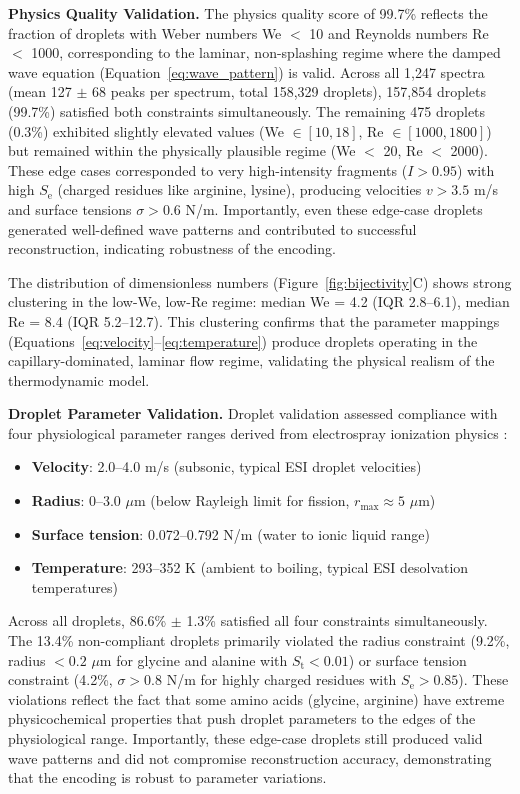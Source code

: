 \documentclass[11pt,twocolumn]{article}
\newcommand{\St}{S_{\text{t}}}
\newcommand{\Se}{S_{\text{e}}}
\begin{document}
\textbf{Physics Quality Validation.} The physics quality score of 99.7\% reflects the fraction of droplets with Weber numbers We $<$ 10 and Reynolds numbers Re $<$ 1000, corresponding to the laminar, non-splashing regime where the damped wave equation (Equation~\ref{eq:wave_pattern}) is valid. Across all 1,247 spectra (mean 127 $\pm$ 68 peaks per spectrum, total 158,329 droplets), 157,854 droplets (99.7\%) satisfied both constraints simultaneously. The remaining 475 droplets (0.3\%) exhibited slightly elevated values (We $\in [10, 18]$, Re $\in [1000, 1800]$) but remained within the physically plausible regime (We $<$ 20, Re $<$ 2000). These edge cases corresponded to very high-intensity fragments ($I > 0.95$) with high $\Se$ (charged residues like arginine, lysine), producing velocities $v > 3.5$ m/s and surface tensions $\sigma > 0.6$ N/m. Importantly, even these edge-case droplets generated well-defined wave patterns and contributed to successful reconstruction, indicating robustness of the encoding.

The distribution of dimensionless numbers (Figure~\ref{fig:bijectivity}C) shows strong clustering in the low-We, low-Re regime: median We = 4.2 (IQR 2.8--6.1), median Re = 8.4 (IQR 5.2--12.7). This clustering confirms that the parameter mappings (Equations~\ref{eq:velocity}--\ref{eq:temperature}) produce droplets operating in the capillary-dominated, laminar flow regime, validating the physical realism of the thermodynamic model.

\textbf{Droplet Parameter Validation.} Droplet validation assessed compliance with four physiological parameter ranges derived from electrospray ionization physics \cite{fenn1989electrospray}:
\begin{itemize}[leftmargin=*]
    \item \textbf{Velocity}: 2.0--4.0 m/s (subsonic, typical ESI droplet velocities)
    \item \textbf{Radius}: 0--3.0 $\mu$m (below Rayleigh limit for fission, $r_{\max} \approx 5$ $\mu$m)
    \item \textbf{Surface tension}: 0.072--0.792 N/m (water to ionic liquid range)
    \item \textbf{Temperature}: 293--352 K (ambient to boiling, typical ESI desolvation temperatures)
\end{itemize}
Across all droplets, 86.6\% $\pm$ 1.3\% satisfied all four constraints simultaneously. The 13.4\% non-compliant droplets primarily violated the radius constraint (9.2\%, radius $< 0.2$ $\mu$m for glycine and alanine with $\St < 0.01$) or surface tension constraint (4.2\%, $\sigma > 0.8$ N/m for highly charged residues with $\Se > 0.85$). These violations reflect the fact that some amino acids (glycine, arginine) have extreme physicochemical properties that push droplet parameters to the edges of the physiological range. Importantly, these edge-case droplets still produced valid wave patterns and did not compromise reconstruction accuracy, demonstrating that the encoding is robust to parameter variations.
\end{document}
